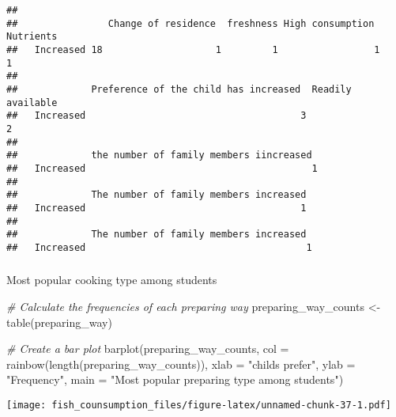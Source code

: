 \documentclass[
]{article}
\newenvironment{Shaded}{\begin{snugshade}}{\end{snugshade}}
\newcommand{\AttributeTok}[1]{\textcolor[rgb]{0.77,0.63,0.00}{#1}}
\newcommand{\CommentTok}[1]{\textcolor[rgb]{0.56,0.35,0.01}{\textit{#1}}}
\newcommand{\FunctionTok}[1]{\textcolor[rgb]{0.00,0.00,0.00}{#1}}
\newcommand{\NormalTok}[1]{#1}
\newcommand{\OtherTok}[1]{\textcolor[rgb]{0.56,0.35,0.01}{#1}}
\newcommand{\SpecialCharTok}[1]{\textcolor[rgb]{0.00,0.00,0.00}{#1}}
\newcommand{\StringTok}[1]{\textcolor[rgb]{0.31,0.60,0.02}{#1}}
\begin{document}
\begin{Shaded}
\end{Shaded}

\begin{verbatim}
##            
##                Change of residence  freshness High consumption  Nutrients
##   Increased 18                    1         1                 1         1
##            
##             Preference of the child has increased  Readily available 
##   Increased                                      3                  2
##            
##             the number of family members iincreased 
##   Increased                                        1
##            
##             The number of family members increased
##   Increased                                      1
##            
##             The number of family members increased 
##   Increased                                       1
\end{verbatim}

\hypertarget{section}{%
\subsubsection{}\label{section}}

Most popular cooking type among students

\begin{Shaded}
\begin{Highlighting}[]
\CommentTok{\# Calculate the frequencies of each preparing way}
\NormalTok{preparing\_way\_counts }\OtherTok{\textless{}{-}} \FunctionTok{table}\NormalTok{(preparing\_way)}

\CommentTok{\# Create a bar plot}
\FunctionTok{barplot}\NormalTok{(preparing\_way\_counts, }\AttributeTok{col =} \FunctionTok{rainbow}\NormalTok{(}\FunctionTok{length}\NormalTok{(preparing\_way\_counts)), }
        \AttributeTok{xlab =} \StringTok{"child\textquotesingle{}s prefer"}\NormalTok{, }\AttributeTok{ylab =} \StringTok{"Frequency"}\NormalTok{, }\AttributeTok{main =} \StringTok{"Most popular preparing type among students"}\NormalTok{)}
\end{Highlighting}
\end{Shaded}

\texttt{[image: fish\_counsumption\_files/figure-latex/unnamed-chunk-37-1.pdf]}
\end{document}
